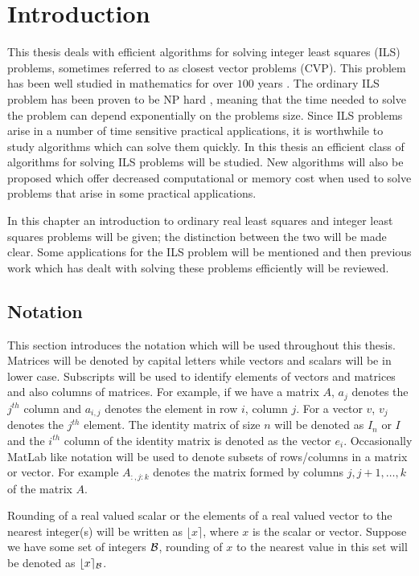 \documentclass[12pt,Bold,letterpaper]{mcgilletdclass}
\begin{document}

\chapter{Introduction}

This thesis deals with efficient algorithms for solving integer least squares (ILS) problems, sometimes referred to as closest vector problems (CVP). This problem has been well studied in mathematics for over $100$ years \cite{HanPS11}. The ordinary ILS problem has been proven to be NP hard \cite{Mic01}, meaning that the time needed to solve the problem can depend exponentially on the problems size. Since ILS problems arise in a number of time sensitive practical applications, it is worthwhile to study algorithms which can solve them quickly. In this thesis an efficient class of algorithms for solving ILS problems will be studied. New algorithms will also be proposed which offer decreased computational or memory cost when used to solve problems that arise in some practical applications.

In this chapter an introduction to ordinary real least squares and integer least squares problems will be given; the distinction between the two will be made clear. Some applications for the ILS problem will be mentioned and then previous work which has dealt with solving these problems efficiently will be reviewed. 

\section{Notation}

This section introduces the notation which will be used throughout this thesis. Matrices will be denoted by capital letters while vectors and scalars will be in lower case. Subscripts will be used to identify elements of vectors and matrices and also columns of matrices. For example, if we have a matrix $A$, $a_j$ denotes the $j^{th}$ column and $a_{i,j}$ denotes the element in row $i$, column $j$. For a vector $v$, $v_j$ denotes the $j^{th}$ element. The identity matrix of size $n$ will be denoted as $I_n$ or $I$ and the $i^{th}$ column of the identity matrix is denoted as the vector $e_i$. Occasionally MatLab like notation will be used to denote subsets of rows/columns in a matrix or vector. For example $A_{:,j:k}$ denotes the matrix formed by columns $j, j+1, \dots, k$ of the matrix $A$.

Rounding of a real valued scalar or the elements of a real valued vector to the nearest integer(s) will be written as $\lfloor x \rceil$, where $x$ is the scalar or vector. Suppose we have some set of integers ${\cal B}$, rounding of $x$ to the nearest value in this set will be denoted as  $\lfloor x \rceil_{{\cal B}}$.
\end{document}
